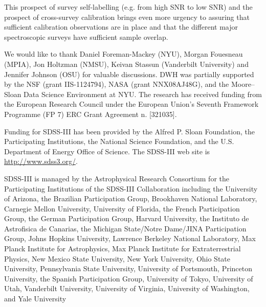 \documentclass[12pt, preprint]{aastex}
\begin{document}
This prospect of survey self-labelling (e.g. from high SNR to low SNR) and the prospect of cross-survey calibration brings even more urgency to assuring that sufficient calibration observations are in place and that the different major spectroscopic surveys have sufficient sample overlap.

\acknowledgements

We would like to thank Daniel Foreman-Mackey (NYU), 
Morgan Fouesneau (MPIA), Jon Holtzman (NMSU),  Keivan Stassun (Vanderbilt University) and Jennifer Johnson (OSU)
for valuable discussions.
DWH was partially supported by
the NSF (grant IIS-1124794), NASA (grant NNX08AJ48G), and the
Moore--Sloan Data Science Environment at NYU.
The research has received funding from the European Research Council under the European
Union's Seventh Framework Programme (FP 7) ERC Grant Agreement n.
[321035].

Funding for SDSS-III has been provided by the Alfred P. Sloan Foundation, the Participating Institutions, 
the National Science Foundation, and the U.S. Department of Energy Office of Science. The SDSS-III web site is \url{http://www.sdss3.org/}.

SDSS-III is managed by the Astrophysical Research Consortium for the Participating Institutions of the SDSS-III Collaboration
 including the University of Arizona, the Brazilian Participation Group, Brookhaven National Laboratory, Carnegie Mellon University, 
 University of Florida, the French Participation Group, the German Participation Group, Harvard University, the Instituto de Astrofisica 
 de Canarias, the Michigan State/Notre Dame/JINA Participation Group, Johns Hopkins University, Lawrence Berkeley National Laboratory, 
 Max Planck Institute for Astrophysics, Max Planck Institute for Extraterrestrial Physics, New Mexico State University, New York University, 
 Ohio State University, Pennsylvania State University, University of Portsmouth, Princeton University, the Spanish Participation Group, 
 University of Tokyo, University of Utah, Vanderbilt University, University of Virginia, University of Washington, and Yale University
\end{document}
